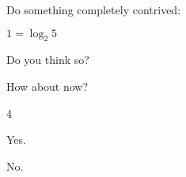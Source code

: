 	Do something completely contrived:
	\begin{subproblem}
		\item $1 = \log_2 5$
		\item Do you think so?
		\skipitem
		\item How about now?
	\end{subproblem}

\solution
	\begin{subproblem}
		\item 4
		\item Yes.
		\skipitem
		\item No.
	\end{subproblem}
